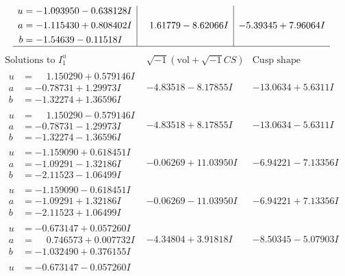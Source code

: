 \documentclass[1p]{elsarticle_modified}
\theoremstyle{definition}
\newcommand{\I}{\sqrt{-1}}
\begin{document}
$$\begin{array}{c|c|c}
\begin{aligned}
u &= -1.093950 - 0.638128 I \\
a &= -1.115430 + 0.808402 I \\
b &= -1.54639 - 0.11518 I\end{aligned}
 & \phantom{-}1.61779 - 8.62066 I & -5.39345 + 7.96064 I\\
 \hline 
 \end{array}$$\newpage$$\begin{array}{c|c|c}  
\text{Solutions to }I^u_{1}& \I (\text{vol} + \sqrt{-1}CS) & \text{Cusp shape}\\
 \hline 
\begin{aligned}
u &= \phantom{-}1.150290 + 0.579146 I \\
a &= -0.78731 + 1.29973 I \\
b &= -1.32274 + 1.36596 I\end{aligned}
 & -4.83518 - 8.17855 I & -13.0634 + 5.6311 I \\ \hline\begin{aligned}
u &= \phantom{-}1.150290 - 0.579146 I \\
a &= -0.78731 - 1.29973 I \\
b &= -1.32274 - 1.36596 I\end{aligned}
 & -4.83518 + 8.17855 I & -13.0634 - 5.6311 I \\ \hline\begin{aligned}
u &= -1.159090 + 0.618451 I \\
a &= -1.09291 - 1.32186 I \\
b &= -2.11523 - 1.06499 I\end{aligned}
 & -0.06269 + 11.03950 I & -6.94221 - 7.13356 I \\ \hline\begin{aligned}
u &= -1.159090 - 0.618451 I \\
a &= -1.09291 + 1.32186 I \\
b &= -2.11523 + 1.06499 I\end{aligned}
 & -0.06269 - 11.03950 I & -6.94221 + 7.13356 I \\ \hline\begin{aligned}
u &= -0.673147 + 0.057260 I \\
a &= \phantom{-}0.746573 + 0.007732 I \\
b &= -1.032490 + 0.376155 I\end{aligned}
 & -4.34804 + 3.91818 I & -8.50345 - 5.07903 I \\ \hline\begin{aligned}
u &= -0.673147 - 0.057260 I \\

\end{aligned}
\end{array}$$
\end{document}
